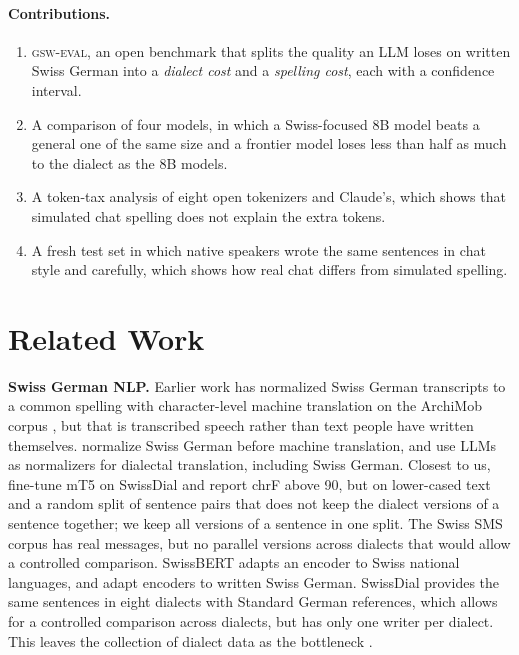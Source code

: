 \documentclass[11pt]{article}
\begin{document}
\paragraph{Contributions.}
\begin{enumerate}
\itemsep0em
\item \textsc{gsw-eval}, an open benchmark that splits the quality an LLM loses on written Swiss
German into a \emph{dialect cost} and a \emph{spelling cost}, each with a confidence interval.
\item A comparison of four models, in which a Swiss-focused 8B model beats a general one of the same
size and a frontier model loses less than half as much to the dialect as the 8B models.
\item A token-tax analysis of eight open tokenizers and Claude's, which shows that simulated chat
spelling does not explain the extra tokens.
\item A fresh test set in which \FreshWriters{} native speakers wrote the same sentences in chat style
and carefully, which shows how real chat differs from simulated spelling.
\end{enumerate}

\section{Related Work}

\textbf{Swiss German NLP.} Earlier work has normalized Swiss German transcripts to a common spelling
with character-level machine translation \citep{scherrer2016normalisation} on the ArchiMob
corpus \citep{samardzic2016archimob}, but that is transcribed speech rather than text people have written themselves.
\citet{honnet2018normalizing} normalize Swiss German before machine translation, and
\citet{alam2025normalizer} use LLMs as normalizers for dialectal translation, including Swiss German.
Closest to us, \citet{kresic2024normalizing} fine-tune mT5 on SwissDial and report chrF above 90,
but on lower-cased text and a random split of sentence pairs that does not keep the dialect versions
of a sentence together; we keep all versions of a sentence in one split.
The Swiss SMS corpus \citep{stark2014sms} has real messages, but no parallel
versions across dialects that would allow a controlled comparison. SwissBERT \citep{vamvas2023swissbert} adapts an encoder to
Swiss national languages, and \citet{vamvas2024modular} adapt encoders to written Swiss German.
SwissDial \citep{dogan2021swissdial} provides the same sentences in eight dialects with Standard
German references, which allows for a controlled comparison across dialects, but has
only one writer per dialect. This leaves the collection of dialect data as the bottleneck \citep{sun2025dialingle}.
\end{document}
